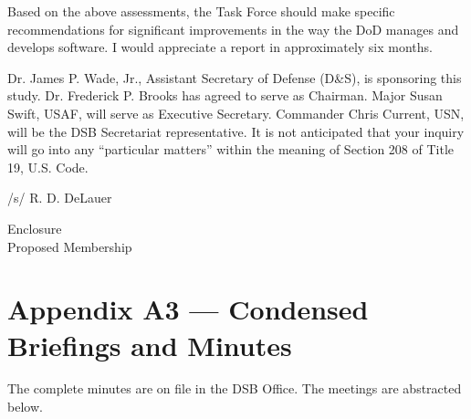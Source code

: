 \documentclass[11pt,final]{article}
\begin{document}
Based on the above assessments, the Task Force should make specific
recommendations for significant improvements in the way the DoD manages and
develops software.  I would appreciate a report in approximately six months.

Dr. James P. Wade, Jr., Assistant Secretary of Defense (D\&S), is sponsoring
this study. Dr. Frederick P. Brooks has agreed to serve as Chairman.  Major
Susan Swift, USAF, will serve as Executive Secretary.  Commander Chris Current,
USN, will be the DSB Secretariat representative.  It is not anticipated that
your inquiry will go into any “particular matters” within the meaning of
Section 208 of Title 19, U.S. Code.

\begin{center}
    /s/ R. D. DeLauer
\end{center}

\noindent Enclosure\\
\hspace*{1ex}Proposed Membership

\newpage

\section*{Appendix A3 — Condensed Briefings and Minutes}


The complete minutes are on file in the DSB Office. The meetings are abstracted
below.

~
\end{document}
